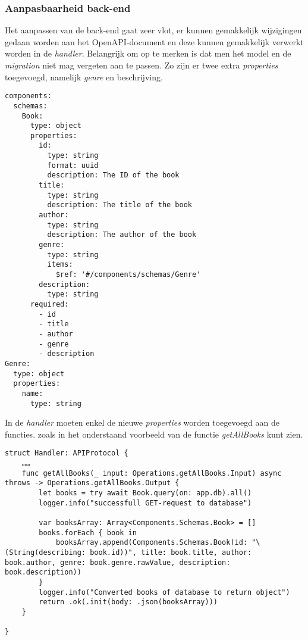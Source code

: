 \subsubsection{Aanpasbaarheid back-end}
Het aanpassen van de back-end gaat zeer vlot, er kunnen gemakkelijk wijzigingen gedaan worden aan het OpenAPI-document en deze kunnen gemakkelijk verwerkt worden in de \textit{handler}. Belangrijk om op te merken is dat men het model en de \textit{migration} niet mag vergeten aan te passen. Zo zijn er twee extra \textit{properties}  toegevoegd, namelijk \textit{genre} en beschrijving. 

\begin{lstlisting}[caption=openapi.yaml file]
components:
  schemas:
    Book:
      type: object
      properties:
        id:
          type: string
          format: uuid
          description: The ID of the book
        title:
          type: string
          description: The title of the book
        author:
          type: string
          description: The author of the book
        genre:
          type: string
          items:
            $ref: '#/components/schemas/Genre'
        description:
          type: string
      required:
        - id
        - title
        - author
        - genre
        - description
Genre:
  type: object
  properties:
    name:
      type: string
\end{lstlisting}

In de \textit{handler} moeten enkel de nieuwe \textit{properties} worden toegevoegd aan de functies. zoals in het onderstaand voorbeeld van de functie \textit{getAllBooks} kunt zien. 

\begin{lstlisting}[caption=handler file]
struct Handler: APIProtocol {
    ……    
    func getAllBooks(_ input: Operations.getAllBooks.Input) async throws -> Operations.getAllBooks.Output {
        let books = try await Book.query(on: app.db).all()
        logger.info("successfull GET-request to database")
        
        var booksArray: Array<Components.Schemas.Book> = []
        books.forEach { book in
            booksArray.append(Components.Schemas.Book(id: "\(String(describing: book.id))", title: book.title, author: book.author, genre: book.genre.rawValue, description: book.description))
        }
        logger.info("Converted books of database to return object")
        return .ok(.init(body: .json(booksArray)))
    }
    
}

\end{lstlisting}

